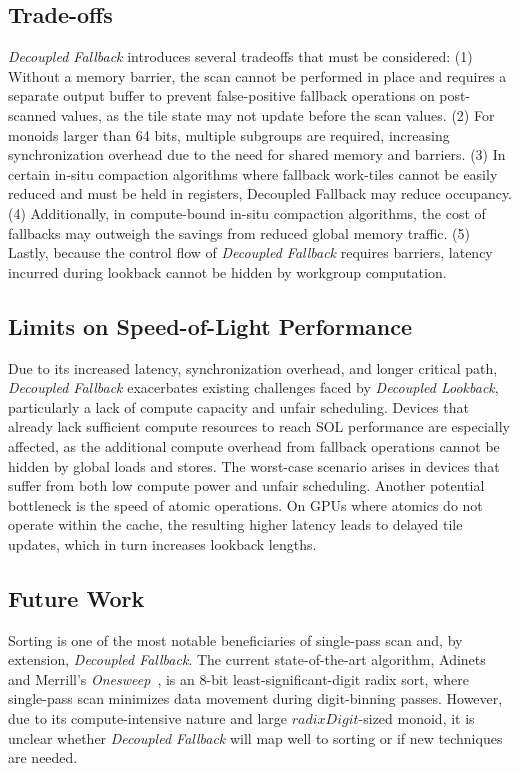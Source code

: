 \documentclass[sigconf,screen]{acmart}
\begin{document}
\subsection{Trade-offs}
\emph{Decoupled Fallback} introduces several tradeoffs that must be considered: (1) Without a memory barrier, the scan cannot be performed in place and requires a separate output buffer to prevent false-positive fallback operations on post-scanned values, as the tile state may not update before the scan values. (2) For monoids larger than 64 bits, multiple subgroups are required, increasing synchronization overhead due to the need for shared memory and barriers. (3) In certain in-situ compaction algorithms where fallback work-tiles cannot be easily reduced and must be held in registers, Decoupled Fallback may reduce occupancy. (4) Additionally, in compute-bound in-situ compaction algorithms, the cost of fallbacks may outweigh the savings from reduced global memory traffic. (5) Lastly, because the control flow of \emph{Decoupled Fallback} requires barriers, latency incurred during lookback cannot be hidden by workgroup computation.

\subsection{Limits on Speed-of-Light Performance}
Due to its increased latency, synchronization overhead, and longer critical path, \emph{Decoupled Fallback} exacerbates existing challenges faced by \emph{Decoupled Lookback}, particularly a lack of compute capacity and unfair scheduling. Devices that already lack sufficient compute resources to reach SOL performance are especially affected, as the additional compute overhead from fallback operations cannot be hidden by global loads and stores. The worst-case scenario arises in devices that suffer from both low compute power and unfair scheduling. Another potential bottleneck is the speed of atomic operations. On GPUs where atomics do not operate within the cache, the resulting higher latency leads to delayed tile updates, which in turn increases lookback lengths.

\subsection{Future Work}
Sorting is one of the most notable beneficiaries of single-pass scan and, by extension, \emph{Decoupled Fallback}. The current state-of-the-art algorithm, Adinets and Merrill's \emph{Onesweep}~\cite{adinets2022onesweepfastersignificantdigit}, is an 8-bit least-significant-digit radix sort, where single-pass scan minimizes data movement during digit-binning passes. However, due to its compute-intensive nature and large $\textit{radixDigit}$-sized monoid, it is unclear whether \emph{Decoupled Fallback} will map well to sorting or if new techniques are needed.
\end{document}
